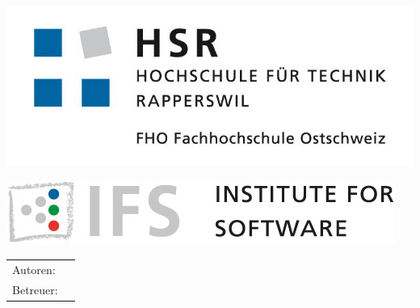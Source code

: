 

\begin{titlepage}

\begin{center}
\begin{minipage}[t]{0.45\textwidth}
    \includegraphics[width=\textwidth]{start/img/hsrLogo}
\end{minipage}
\hspace{\fill} %
\begin{minipage}[t]{0.45\textwidth}
    \vspace{-2.56cm}
    \includegraphics[width=\textwidth]{start/img/ifsLogo}
\end{minipage}

\end{center}

\vspace{15ex} %
\Huge
\textbf{\titel}

\huge
\textbf{\subtitel}

\vspace{4ex}
\textbf{\work}

\vspace{1ex}
\LARGE 
\place

\vspace{5ex}
\timeperiod

\vspace{11ex}
\begin{tabular}{ll} %
	Autoren:        & \authors    \\
	Betreuer:        & \advisor    \\
\end{tabular}

\end{titlepage}

\restoregeometry %
